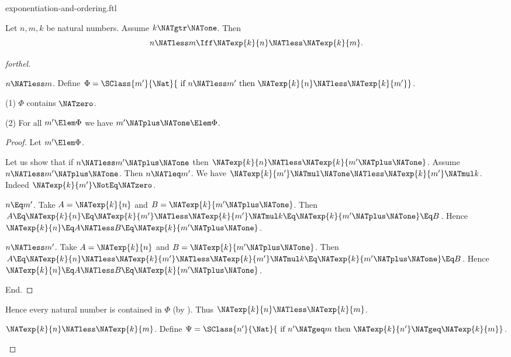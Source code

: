 \documentclass{stex}
\begin{document}
\begin{smodule}{exponentiation-and-ordering.ftl}
\begin{proposition}[forthel]
  Let $n, m, k$ be natural numbers.
  Assume $k \NATgtr \NATone$.
  Then \[ n \NATless m \Iff \NATexp{k}{n} \NATless \NATexp{k}{m}. \]
\end{proposition}
\begin{proof}[forthel]
  \begin{case}{$n \NATless m$.}
    Define $\Phi = \SClass{m'}{\Nat}{\text{ if }n \NATless m'\text{ then }\NATexp{k}{n} \NATless \NATexp{k}{m'}}$.

    (1) $\Phi$ contains $\NATzero$.

    (2) For all $m' \Elem \Phi$ we have $m' \NATplus \NATone \Elem \Phi$.
    \begin{proof}
      Let $m' \Elem \Phi$.

      Let us show that if $n \NATless m' \NATplus \NATone$ then $\NATexp{k}{n} \NATless \NATexp{k}{m' \NATplus \NATone}$.
        Assume $n \NATless m' \NATplus \NATone$.
        Then $n \NATleq m'$.
        We have $\NATexp{k}{m'} \NATmul \NATone \NATless \NATexp{k}{m'} \NATmul k$.
        Indeed $\NATexp{k}{m'} \NotEq \NATzero$.

        \begin{case}{$n \Eq m'$.}
          Take $A = \NATexp{k}{n}$ and $B = \NATexp{k}{m' \NATplus \NATone}$. %
          Then $A
            \Eq \NATexp{k}{n}
            \Eq \NATexp{k}{m'}
            \NATless \NATexp{k}{m'} \NATmul k
            \Eq \NATexp{k}{m' \NATplus \NATone}
            \Eq B$.
          Hence $\NATexp{k}{n} \Eq A \NATless B \Eq \NATexp{k}{m' \NATplus \NATone}$.
        \end{case}

        \begin{case}{$n \NATless m'$.}
          Take $A = \NATexp{k}{n}$ and $B = \NATexp{k}{m' \NATplus \NATone}$. %
          Then $A
            \Eq \NATexp{k}{n}
            \NATless \NATexp{k}{m'}
            \NATless \NATexp{k}{m'} \NATmul k
            \Eq \NATexp{k}{m' \NATplus \NATone}
            \Eq B$.
          Hence $\NATexp{k}{n} \Eq A \NATless B \Eq \NATexp{k}{m' \NATplus \NATone}$.
        \end{case}
      End.
    \end{proof}

    Hence every natural number is contained in $\Phi$ (by ).
    Thus $\NATexp{k}{n} \NATless \NATexp{k}{m}$.
  \end{case}

  \begin{case}{$\NATexp{k}{n} \NATless \NATexp{k}{m}$.}
    Define $\Psi = \SClass{n'}{\Nat}{\text{ if }n' \NATgeq m\text{ then }
    \NATexp{k}{n'} \NATgeq \NATexp{k}{m}}$.


\end{case}
\end{proof}
\end{smodule}
\end{document}
